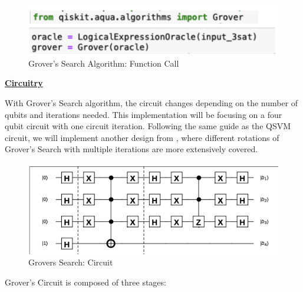 \begin{figure}[H]
      \centering
      \includegraphics[scale=0.6]{background/GroverImp.png}
      \caption{Grover's Search Algorithm: Function Call}
      \label{GrvImp}
\end{figure}


\vspace{0.3cm}
\textbf{\underline{Circuitry}}

With Grover's Search algorithm, the circuit changes depending on the number of qubits and iterations needed. This implementation will be focusing on a four qubit circuit with one circuit iteration. 
Following the same guide as the QSVM circuit, we will implement another design from %
\citep{mcrae2020}, where different rotations of Grover's Search with multiple iterations are more extensively covered.  

\begin{figure}[H]
      \centering
      \includegraphics[scale=0.8]{background/GroverCir.png}
      \caption{Grovers Search: Circuit \cite{mcrae2020}}
      \label{GrvCir}
\end{figure}


Grover's Circuit is composed of three stages:

